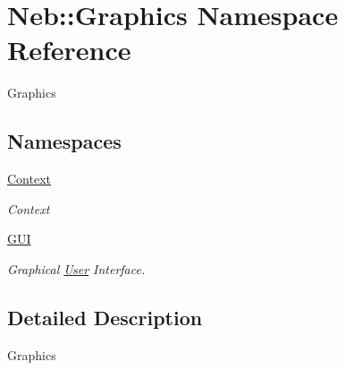 \hypertarget{namespaceNeb_1_1Graphics}{\section{Neb\-:\-:Graphics Namespace Reference}
\label{namespaceNeb_1_1Graphics}
}


Graphics  


\subsection*{Namespaces}
\begin{DoxyCompactItemize}
\item 
\hyperlink{namespaceNeb_1_1Graphics_1_1Context}{Context}
\begin{DoxyCompactList}\small\item\em Context \end{DoxyCompactList}\item 
\hyperlink{namespaceNeb_1_1Graphics_1_1GUI}{G\-U\-I}
\begin{DoxyCompactList}\small\item\em Graphical \hyperlink{classNeb_1_1User}{User} Interface. \end{DoxyCompactList}\end{DoxyCompactItemize}


\subsection{Detailed Description}
Graphics 